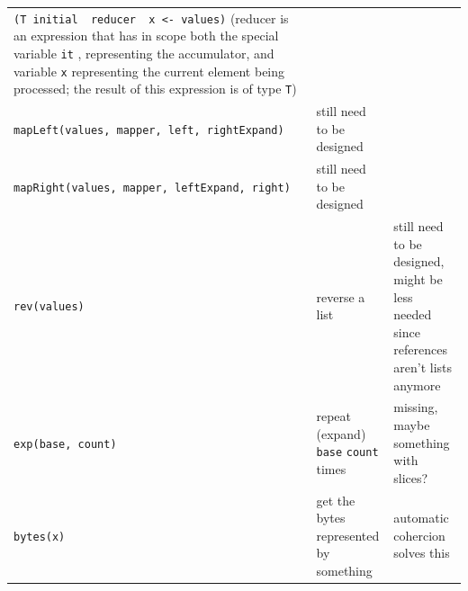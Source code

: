 \documentclass[10pt,oneside]{article}
\begin{document}
\begin{longtable}[]{@{}p{5cm} p{4.5cm} p{5.5cm}@{}}
\texttt{(T\ initial\ \textbar{}\ reducer\ \textbar{}\ x\ \textless{}-\ values)}
(reducer is an expression that has in scope both the special variable
\texttt{it} , representing the accumulator, and variable \texttt{x}
representing the current element being processed; the result of this
expression is of type \texttt{T})\tabularnewline
\texttt{mapLeft(values,\ mapper,\ left,\ rightExpand)} & still need to
be designed &\tabularnewline
\texttt{mapRight(values,\ mapper,\ leftExpand,\ right)} & still need to
be designed &\tabularnewline
\texttt{rev(values)} & reverse a list & still need to be designed, might
be less needed since references aren't lists anymore\tabularnewline
\texttt{exp(base,\ count)} & repeat (expand) \texttt{base}
\texttt{count} times & missing, maybe something with
slices?\tabularnewline
\texttt{bytes(x)} & get the bytes represented by something & automatic
cohercion solves this\tabularnewline
\bottomrule
\end{longtable}
\end{document}
